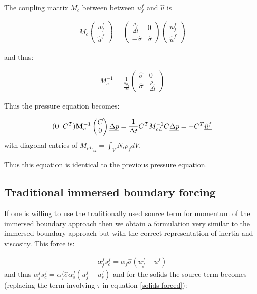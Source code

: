 The coupling matrix $M_c$ between between $u_f^f$ and $\hat u$ is

\begin{eqnarray}
M_c 
\begin{pmatrix}
u_f^f \\ \hat u^f
\end{pmatrix}  
=
\begin{pmatrix}
\frac{\rho_f}{\Delta t}  & 0 \\ 
-\hat\sigma  &\hat\sigma 
\end{pmatrix} 
\begin{pmatrix}
u_f^f \\ \hat u^f
\end{pmatrix}  
\end{eqnarray}

and thus:

\begin{eqnarray}
M_c^{-1}=\frac{1}{ \frac{\hat\sigma\rho_f}{\Delta t}} 
\begin{pmatrix}
\hat\sigma  & 0 \\ 
 \hat\sigma  & \frac{\rho_f}{\Delta t} 
\end{pmatrix}  
\end{eqnarray}

Thus the pressure equation becomes:

\begin{eqnarray}
(0 \;\; C^T) {\bf M}_c^{-1} 
\begin{pmatrix}
 C \\ 0  
\end{pmatrix}  
\underline{\Delta p} 
= \frac{1}{\Delta t} 
C^T M_{\rho L}^{-1} C \underline{\Delta p}= - C^T \underline{ \hat u^f }
\label{delt-p-classic27}
\end{eqnarray} 
with diagonal entries of ${M_{\rho L}}_{ii}=\int_V N_i \rho_f dV$.

Thus this equation is identical to the previous pressure equation. 

\subsection{Traditional immersed boundary forcing} 
If one is willing to use the traditionally used 
source term for momentum of the immersed boundary 
approach then we obtain a formulation very similar to the 
immersed boundary approach but with the correct 
representation of inertia and viscosity. 
This force is:

\begin{eqnarray}
\alpha_f^f s_c^f = \alpha_f \hat\sigma (u^f_f -u^f)
\label{immersed-bc-force-traditional}
\end{eqnarray}
and thus $\alpha_f^f s_c^f = \alpha_f^f \hat\sigma \alpha_s^f (u^f_f -u^f_s)$  
and for the solids the source term becomes 
(replacing the term involving $\tau$ in equation \ref{solids-forced}): 


